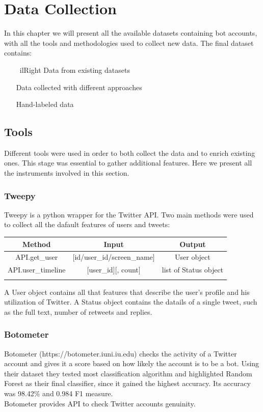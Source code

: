 
\chapter{Data Collection}
\label{capitolo3}
\thispagestyle{empty}


In this chapter we will present all the available datasets containing bot accounts, with all the tools and methodologies used to collect new data. The final dataset contains:

\begin{itemize}
\item[\
ilRight]
Data from existing datasets
\item[\PencilRight]
Data collected with different approaches
\item[\PencilRight]
Hand-labeled data
\end{itemize}



\section{Tools}
Different tools were used in order to both collect the data and to enrich existing ones. This stage was essential to gather additional features. Here we present all the instruments involved in this section.

\subsection{Tweepy}
Tweepy is a python wrapper for the Twitter API.
Two main methods were used to collect all the dafault features of users and tweets:\\

\begin{tabular}{ccc}
\centering	
	Method&Input&Output\\ \hline\hline
	API.get\_user&[id/user\_id/screen\_name]&User object\\
	API.user\_timeline&[user\_id][, count]&list of Status object\\ \hline\\
\end{tabular}

A User object contains all that features that describe the user's profile and his utilization of Twitter.
A Status object contains the datails of a single tweet, such as the full text, number of retweets and replies.

\subsection{Botometer}
Botometer (https://botometer.iuni.iu.edu) checks the activity of a Twitter account and gives it a score based on how likely the account is to be a bot.
Using their dataset they tested most classification algorithm and highlighted Random Forest as their final classifier, since it gained the highest accuracy. Its accuracy was 98.42\% and 0.984 F1 measure\cite{Lee11sevenmonths}.
\\Botometer provides API to check Twitter accounts genuinity.

